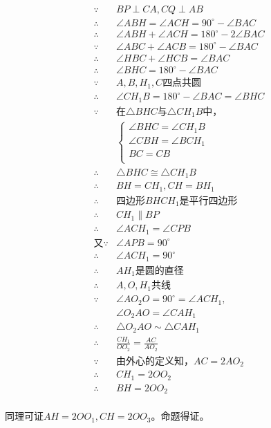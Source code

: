 \begin{align*}
  \because  {}& BP \perp CA, CQ \perp AB \\
  \therefore{}& \angle ABH = \angle ACH = 90^\circ - \angle BAC \\
  \therefore{}& \angle ABH + \angle ACH = 180^\circ - 2\angle BAC \\
  \because  {}& \angle ABC + \angle ACB = 180^\circ - \angle BAC \\
  \therefore{}& \angle HBC + \angle HCB = \angle BAC \\
  \therefore{}& \angle BHC = 180^\circ - \angle BAC \\
  \because  {}& A, B, H_1, C\text{四点共圆} \\
  \therefore{}& \angle CH_1B = 180^\circ - \angle BAC = \angle BHC \\
  \because  {}& \text{在}\triangle BHC\text{与}\triangle CH_1B\text{中，} \\
  & \begin{cases}
    \angle BHC = \angle CH_1B \\
    \angle CBH = \angle BCH_1 \\
    BC = CB \\
  \end{cases} \\
  \therefore{}& \triangle BHC \cong \triangle CH_1B \\
  \therefore{}& BH = CH_1, CH = BH_1 \\
  \therefore{}& \text{四边形}BHCH_1\text{是平行四边形} \\
  \therefore{}& CH_1 \parallel BP \\
  \therefore{}& \angle ACH_1 = \angle CPB \\
  \text{又}\because{}& \angle APB = 90^\circ \\
  \therefore{}& \angle ACH_1 = 90^\circ \\
  \therefore{}& AH_1\text{是圆的直径} \\
  \therefore{}& A, O, H_1\text{共线} \\
  \because  {}& \angle AO_2O = 90^\circ = \angle ACH_1, \\
  & \angle O_2AO = \angle CAH_1 \\
  \therefore{}& \triangle O_2AO \sim \triangle CAH_1 \\
  \therefore{}& \frac{CH_1}{OO_2} = \frac{AC}{AO_2} \\
  \because  {}& \text{由外心的定义知，}AC = 2AO_2 \\
  \therefore{}& CH_1 = 2OO_2 \\
  \therefore{}& BH = 2OO_2 \\
\end{align*}

同理可证$AH = 2OO_1, CH = 2OO_3$。命题得证。
